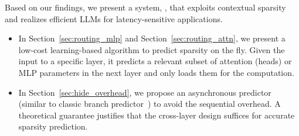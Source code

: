 Based on our findings, we present a system, \name{}, that exploits contextual sparsity and realizes efficient LLMs for latency-sensitive applications.
\vspace{-0.7mm}
\begin{itemize}[itemsep=0.1pt,topsep=0pt,leftmargin=*]
\item  In Section~\ref{sec:routing_mlp} and Section~\ref{sec:routing_attn}, we present a low-cost learning-based algorithm to predict sparsity on the fly. Given the input to a specific layer, it predicts a relevant subset of attention (heads) or MLP parameters in the next layer and only loads them for the computation.
\vspace{-0.2mm}
\item  In Section~\ref{sec:hide_overhead}, we propose an asynchronous predictor (similar to classic branch predictor~\cite{smith1998study}) to avoid the sequential overhead. A theoretical guarantee justifies that the cross-layer design suffices for accurate sparsity prediction.
    
\end{itemize}

